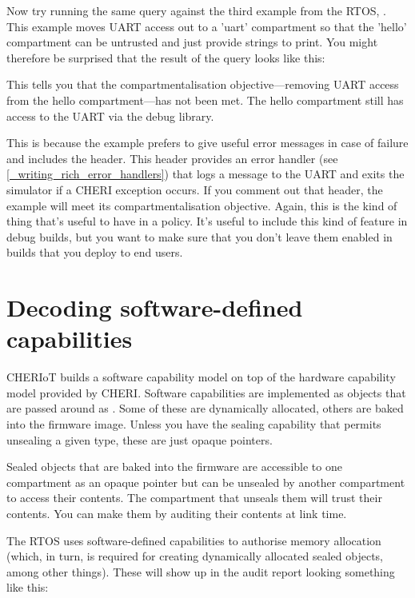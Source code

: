 {Now try running the same query against the third example from the RTOS, .
This example moves UART access out to a 'uart' compartment so that the 'hello' compartment can be untrusted and just provide strings to print.
You might therefore be surprised that the result of the query looks like this:

\begin{jsonsnippet}
\end{jsonsnippet}

This tells you that the compartmentalisation objective—removing UART access from the hello compartment—has not been met.
The hello compartment still has access to the UART via the debug library.

This is because the example prefers to give useful error messages in case of failure and includes the  header.
This header provides an error handler (see \ref{_writing_rich_error_handlers}) that logs a message to the UART and exits the simulator if a CHERI exception occurs.
If you comment out that header, the example will meet its compartmentalisation objective.
Again, this is the kind of thing that's useful to have in a policy.
It's useful to include this kind of feature in debug builds, but you want to make sure that you don't leave them enabled in builds that you deploy to end users.

\section{Decoding software-defined capabilities}

CHERIoT builds a software capability model on top of the hardware capability model provided by CHERI.
Software capabilities are implemented as objects that are passed around as .
Some of these are dynamically allocated, others are baked into the firmware image.
Unless you have the sealing capability that permits unsealing a given type, these are just opaque pointers.

Sealed objects that are baked into the firmware are accessible to one compartment as an opaque pointer but can be unsealed by another compartment to access their contents.
The compartment that unseals them will trust their contents.
You can make them  by auditing their contents at link time.

The RTOS uses software-defined capabilities to authorise memory allocation (which, in turn, is required for creating dynamically allocated sealed objects, among other things).
These will show up in the audit report looking something like this:

}
